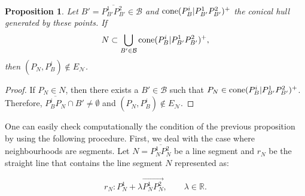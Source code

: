 \documentclass[a4paper,  review, authoryear, 1p.]{elsarticle}
\newcommand{\EN}{{E^{}_{\mathcal N}}}
\newtheorem{prop}{Proposition}
\begin{document}
	\begin{prop}
		
		Let $B'=\overline{P^1_{B'}P^2_{B'}}\in\mathcal B$ and $\normalfont{\text{cone}}(P^i_B|P^1_{B'}P^2_{B'})^+$ the conical hull generated by these points. If
		$$N\subset\bigcup_{B'\in\mathcal B}\normalfont{\text{cone}}(P^i_B| P^1_{B'}P^2_{B'})^+,$$
		then $(P^{}_N, P^i_B)\not\in \EN$.
		
	\end{prop}
	\begin{proof}
		If $P_N\in N$, then there exists a $B'\in\mathcal B$ such that 
		$P_N\in \normalfont{\text{cone}}(P^i_B|P^1_{B'}P^2_{B'})^+$. Therefore, $\overline{P^i_B P^{}_N}\cap B'\neq\emptyset$ and $(P^{}_N, P^i_B)\not\in \EN$.
	\end{proof}
	
	One can easily check computationally the condition of the previous proposition by using the following procedure. First, we deal with the case where neighbourhoods are segments. Let $N = \overline{P^1_N P^2_N}$ be a line segment and $r_N$ be the straight line that contains the line segment $N$ represented as:
	
	$$r_N:P_N^1+\lambda\overrightarrow{P_N^1P_N^2},\qquad\lambda\in\mathbb R.$$
	
\end{document}
